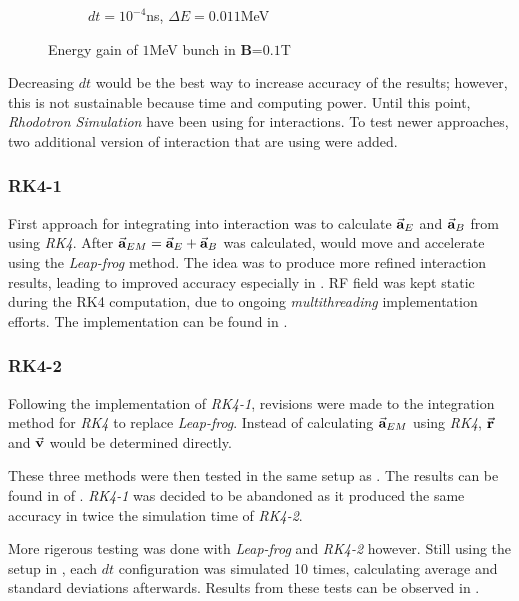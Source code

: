\documentclass[a4paper,oneside,12pt]{report}
\numberwithin{equation}{chapter}
\begin{document}
\begin{figure}[H]
\begin{subfigure}{0.8\textwidth}
        \caption*{$dt=10^{-4}$ns, $\Delta E=0.011$MeV}
    \end{subfigure}
    \caption{Energy gain of $1$MeV bunch in \textbf{B}=$0.1$T}
    \label{fig:mag_lf_render}
\end{figure}

Decreasing $dt$ would be the best way to increase accuracy of the results; however, this is not sustainable because time and computing power. 
Until this point, \textit{Rhodotron Simulation} have been using  for \eEM interactions. 
To test newer approaches, two additional version of  \eEM interaction that are using  were added.
\subsubsection{RK4-1}
First approach for integrating  into \eEM interaction was to calculate $\vec{\textbf{a}}_{E}$ and $\vec{\textbf{a}}_{B}$ from  using \textit{RK4}.
After $\vec{\textbf{a}}_{EM} = \vec{\textbf{a}}_{E} + \vec{\textbf{a}}_{B}$ was calculated, \e would move and accelerate using the \textit{Leap-frog} method. 
The idea was to produce more refined interaction results, leading to improved accuracy especially in \eB.
RF field was kept static during the RK4 computation, due to ongoing \textit{multithreading} implementation efforts. 
The implementation can be found in .
\subsubsection{RK4-2}
Following the implementation of \textit{RK4-1}, revisions were made to the integration method for \textit{RK4} to replace \textit{Leap-frog}.
Instead of calculating $\vec{\textbf{a}}_{EM}$ using \textit{RK4}, $\vec{\textbf{r}}$ and $\vec{\textbf{v}}$ would be determined directly.

These three methods were then tested in the same setup as . The results can be found in  of .
\textit{RK4-1} was decided to be abandoned as it produced the same accuracy in twice the simulation time of \textit{RK4-2}.

More rigerous testing was done with \textit{Leap-frog} and \textit{RK4-2} however. 
Still using the setup in , each $dt$ configuration was simulated 10 times, calculating average and standard deviations afterwards.
Results from these tests can be observed in .
\end{document}
